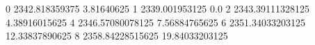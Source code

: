 0 2342.818359375 3.81640625
1 2339.001953125 0.0
2 2343.39111328125 4.38916015625
4 2346.57080078125 7.56884765625
6 2351.34033203125 12.33837890625
8 2358.84228515625 19.84033203125
